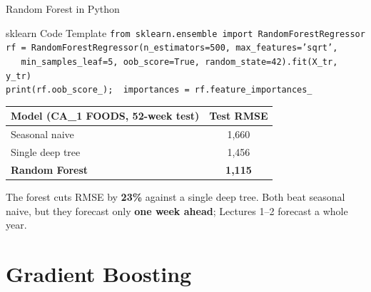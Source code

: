 \documentclass[aspectratio=169, 11pt]{beamer}
\begin{document}
\begin{frame}{Random Forest in Python}
  \begin{examplebox}{sklearn Code Template}
    {\scriptsize
    \texttt{from sklearn.ensemble import RandomForestRegressor}\\
    \texttt{rf = RandomForestRegressor(n\_estimators=500, max\_features='sqrt',}\\
    \texttt{\mbox{}\ \ \ min\_samples\_leaf=5, oob\_score=True, random\_state=42).fit(X\_tr, y\_tr)}\\
    \texttt{print(rf.oob\_score\_);\ \ importances = rf.feature\_importances\_}
    }
  \end{examplebox}
  \begin{center}
    {\footnotesize
    \begin{tabular}{lc}
      \toprule
      \textbf{Model (CA\_1 FOODS, 52-week test)} & \textbf{Test RMSE} \\
      \midrule
      Seasonal naive       & 1,660 \\
      Single deep tree     & 1,456 \\
      \textbf{Random Forest} & \textbf{1,115} \\
      \bottomrule
    \end{tabular}
    }
  \end{center}

  The forest cuts RMSE by \textbf{23\%} against a single deep tree. Both beat seasonal naive,
  but they forecast only \textbf{one week ahead}; Lectures 1--2 forecast a whole year.

\end{frame}

\section{Gradient Boosting}

\end{document}
